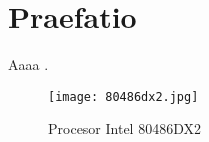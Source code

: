 \newpage %
\section{Praefatio}
\lipsum[1-2] Aaaa \cite{goossens93}.

\begin{figure}[!h]
    \label{fig:486dx2}
    \centering \texttt{[image: 80486dx2.jpg]}
    \caption{Procesor Intel 80486DX2 \cite{Wiki:486dx2}}
\end{figure}

\lipsum[3-4]
